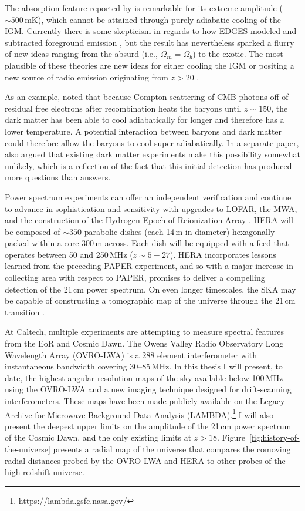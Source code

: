 \begin{bibunit}
The absorption feature reported by \citet{2018Natur.555...67B} is remarkable for its extreme
amplitude ($\sim 500\,\text{mK}$), which cannot be attained through purely adiabatic cooling of the
IGM.  Currently there is some skepticism in regards to how EDGES modeled and subtracted foreground
emission \citep{2018arXiv180501421H}, but the result has nevertheless sparked a flurry of new ideas
ranging from the absurd (i.e., $\Omega_m = \Omega_b$) to the exotic.  The most plausible of these
theories are new ideas for either cooling the IGM \citep[e.g.,][]{2018Natur.555...71B} or positing a
new source of radio emission originating from $z > 20$ \citep[e.g.,][]{2018arXiv180301815E}.

As an example, \citet{2018Natur.555...71B} noted that because Compton scattering of CMB photons off
of residual free electrons after recombination heats the baryons until $z\sim 150$, the dark matter
has been able to cool adiabatically for longer and therefore has a lower temperature. A potential
interaction between baryons and dark matter could therefore allow the baryons to cool
super-adiabatically. In a separate paper, \citet{2018arXiv180303091B} also argued that existing dark
matter experiments make this possibility somewhat unlikely, which is a reflection of the fact that
this initial detection has produced more questions than answers.

Power spectrum experiments can offer an independent verification and continue to advance in
sophistication and sensitivity with upgrades to LOFAR, the MWA, and the construction of the Hydrogen
Epoch of Reionization Array \citep[HERA;][]{2017PASP..129d5001D}. HERA will be composed of $\sim350$
parabolic dishes (each 14\,m in diameter) hexagonally packed within a core 300\,m across.  Each dish
will be equipped with a feed that operates between 50 and 250\,MHz ($z\sim5-27$). HERA incorporates
lessons learned from the preceding PAPER experiment, and so with a major increase in collecting area
with respect to PAPER, promises to deliver a compelling detection of the 21\,cm power spectrum.
On even longer timescales, the SKA may be capable of constructing a tomographic map of the universe
through the 21\,cm transition \citep{2013ExA....36..235M}.

At Caltech, multiple experiments are attempting to measure spectral features from the EoR and Cosmic
Dawn. The Owens Valley Radio Observatory Long Wavelength Array (OVRO-LWA) is a 288 element
interferometer with instantaneous bandwidth covering 30--85\,MHz. In this thesis I will present, to
date, the highest angular-resolution maps of the sky available below 100\,MHz using the OVRO-LWA and
a new imaging technique designed for drift-scanning interferometers. These maps have been made
publicly available on the Legacy Archive for Microwave Background Data Analysis (LAMBDA).\footnote{
    \url{https://lambda.gsfc.nasa.gov/}
}
I will also present the deepest upper limits on the amplitude of the 21\,cm power spectrum of the
Cosmic Dawn, and the only existing limits at $z > 18$. Figure~\ref{fig:history-of-the-universe}
presents a radial map of the universe that compares the comoving radial distances probed by the
OVRO-LWA and HERA to other probes of the high-redshift universe.


\end{bibunit}
